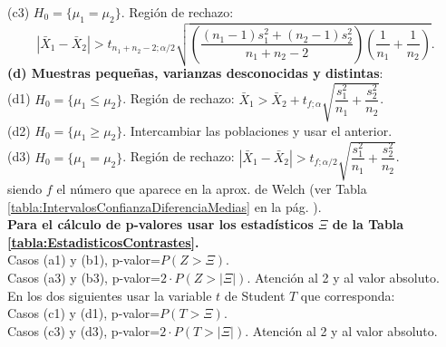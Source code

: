 \begin{table}[h]
\begin{center}
{\begin{minipage}{13.5cm}
       (c3) $H_0=\{\mu_1=\mu_2\}$. Región de rechazo:
       \[|\bar X_1-\bar X_2|>\displaystyle{{t_{n_1+n_2-2;\alpha/2}}}{\sqrt{\left(\dfrac{(n_1-1)s_1^2+(n_2-1)s_2^2}{n_1+n_2-2}\right)\left(\dfrac{1}{n_1}+\dfrac{1}{n_2}\right)}}.\]
       {\bf (d) Muestras pequeñas, varianzas desconocidas y distintas}:\\
       (d1) $H_0=\{\mu_1\leq\mu_2\}$. Región de rechazo: $\bar X_1>\bar X_2+{t_{f;\alpha}}\sqrt{\dfrac{s_1^2}{n_1}+\dfrac{s_2^2}{n_2}}$.\\
       (d2) $H_0=\{\mu_1\geq\mu_2\}$. Intercambiar las poblaciones y usar el anterior.\\
       (d3) $H_0=\{\mu_1=\mu_2\}$. Región de rechazo: $|\bar X_1-\bar X_2|>{t_{f;\alpha/2}}\sqrt{\dfrac{s_1^2}{n_1}+\dfrac{s_2^2}{n_2}}$.\\
       siendo $f$ el número que aparece en la aprox. de Welch (ver Tabla \ref{tabla:IntervalosConfianzaDiferenciaMedias} en la pág. \pageref{tabla:IntervalosConfianzaDiferenciaMedias}).\\[3mm]
       {\bf Para el cálculo de p-valores usar los estadísticos $\Xi$ de la Tabla \ref{tabla:EstadisticosContrastes}.}\\
       Casos (a1) y (b1), p-valor=$P\left(Z>\Xi\right)$.\\
       Casos (a3) y (b3), p-valor=$2\cdot P\left(Z>|\Xi|\right)$. Atención al 2 y al valor absoluto.\\
       En los dos siguientes usar la variable $t$ de Student $T$ que corresponda:\\
       Casos (c1) y (d1), p-valor=$P\left(T>\Xi\right)$.\\
       Casos (c3) y (d3), p-valor=$2\cdot P\left(T>|\Xi|\right)$. Atención al 2 y al valor absoluto.\\
    \end{minipage}}
    \end{center}
\end{table}



